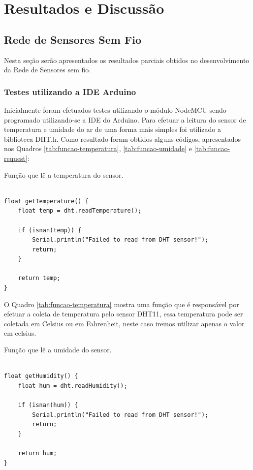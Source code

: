 \chapter{Resultados e Discussão}

\section{Rede de Sensores Sem Fio}
Nesta seção serão apresentados os resultados parciais obtidos no desenvolvimento da Rede de Sensores sem fio.

\subsection{Testes utilizando a IDE Arduino}
Inicialmente foram efetuados testes utilizando o módulo NodeMCU sendo programado utilizando-se a IDE do Arduino. Para efetuar a leitura do sensor de temperatura e umidade do ar de uma forma mais simples foi utilizado a biblioteca DHT.h. Como resultado foram obtidos alguns códigos, apresentados nos Quadros \ref{tab:funcao-temperatura}, \ref{tab:funcao-umidade} e \ref{tab:funcao-request}:

\begin{quadro}[H]
\centering
\caption{Função que lê a temperatura do sensor.}
\vspace{-\baselineskip}
\begin{verbatim}

float getTemperature() {
    float temp = dht.readTemperature();
    
    if (isnan(temp)) {
        Serial.println("Failed to read from DHT sensor!");
        return;
    }
    
    return temp;
}
\end{verbatim}
\vspace{-1.2cm}
\label{tab:funcao-temperatura}
\end{quadro}

O Quadro \ref{tab:funcao-temperatura} mostra uma função que é responsável por efetuar a coleta de temperatura pelo sensor DHT11, essa temperatura pode ser coletada em Celsius ou em Fahrenheit, neste caso iremos utilizar apenas o valor em celsius.

\begin{quadro}[H]
\centering
\caption{Função que lê a umidade do sensor.}
\vspace{-\baselineskip}
\begin{verbatim}

float getHumidity() {
    float hum = dht.readHumidity();
    
    if (isnan(hum)) {
        Serial.println("Failed to read from DHT sensor!");
        return;
    }
    
    return hum;
}
\end{verbatim}
\vspace{-1.2cm}
\label{tab:funcao-umidade}
\end{quadro}

